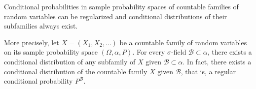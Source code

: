 Conditional probabilities in sample probability spaces of countable families of random variables can be regularized and conditional distributions of their subfamilies always exist.

More precisely, let $X = (X_1, X_2, \ldots)$ be a countable family of random variables on its sample probability space $(\Omega, \alpha, P)$. For every $\sigma$-field $\mathcal{B} \subset \alpha$, there exists a conditional distribution of any subfamily of $X$ given $\mathcal{B} \subset \alpha$. In fact, there exists a conditional distribution of the countable family $X$ given $\mathcal{B}$, that is, a regular conditional probability $P^{\mathcal{B}}$.
